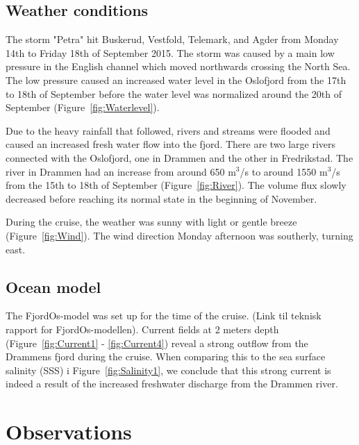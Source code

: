 \documentclass[12pt,a4paper,english]{article}
\begin{document}
\subsection{Weather conditions}

The storm "Petra" hit Buskerud, Vestfold, Telemark, and Agder from Monday 14th to Friday 18th of September 2015. The storm was caused by a main low pressure in the English channel which moved northwards crossing the North Sea. The low pressure caused an increased water level in the Oslofjord from the 17th to 18th of September before the water level was normalized around the 20th of September (Figure~\ref{fig:Waterlevel}).

Due to the heavy rainfall that followed, rivers and streams were flooded and caused an increased fresh water flow into the fjord. There are two large rivers connected with the Oslofjord, one in Drammen and the other in Fredrikstad. The river in Drammen had an increase from around 650 m$^3$/s to around 1550 m$^3$/s from the 15th to 18th of September (Figure~\ref{fig:River}). The volume flux slowly decreased before reaching its normal state in the beginning of November. 

During the cruise, the weather was sunny with light or gentle breeze (Figure~\ref{fig:Wind}). The wind direction Monday afternoon was southerly, turning east. 

\subsection{Ocean model}
The FjordOs-model was set up for the time of the cruise. (Link til teknisk rapport for FjordOs-modellen). Current fields at 2 meters depth (Figure~\ref{fig:Current1} - \ref{fig:Current4}) reveal a strong outflow from the Drammens fjord during the cruise. When comparing this to the sea surface salinity (SSS) i Figure~\ref{fig:Salinity1}, we conclude that this strong current is indeed a result of the increased freshwater discharge from the Drammen river.



\clearpage

\section{Observations}
\end{document}
